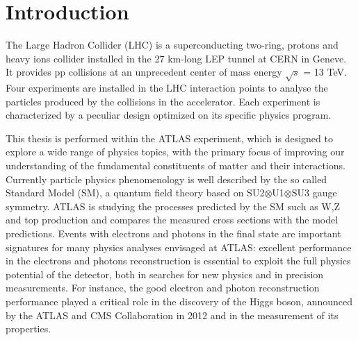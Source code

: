 \documentclass[a4paper, oneside, 11pt, openright]{book}
\begin{document}
\clearpage\null\thispagestyle{empty}\newpage

\tableofcontents

	\chapter*{Introduction}
		The Large Hadron Collider (LHC) is a superconducting two-ring, protons and heavy ions collider installed in the 27 km-long LEP tunnel at CERN in Geneve. It provides pp collisions at an unprecedent center of mass energy $\sqrt{s}$ = 13 TeV. Four experiments are installed in the LHC interaction points to analyse the particles produced by the collisions in the accelerator. Each experiment is characterized by a peculiar design optimized on its specific physics program.
		
		This thesis is performed within the ATLAS experiment, which is designed to explore a wide range of physics topics, with the primary focus of improving our understanding of the fundamental constituents of matter and their interactions. Currently particle physics phenomenology is well described by the so called Standard Model (SM), a quantum field theory based on SU2$\otimes$U1$\otimes$SU3 gauge symmetry. ATLAS is studying the processes predicted by the SM such as W,Z and top production and compares the measured cross sections with the model predictions. Events with electrons and photons in the final state are important signatures for many
		physics analyses envisaged at ATLAS: excellent performance in the electrons and photons reconstruction is essential to exploit the full physics potential of the detector, both in searches for new physics and in precision measurements. For instance, the good electron and photon reconstruction performance played a critical role in the discovery of the Higgs boson, announced by the ATLAS and CMS Collaboration in 2012 and in the measurement of its properties.
		
\end{document}
